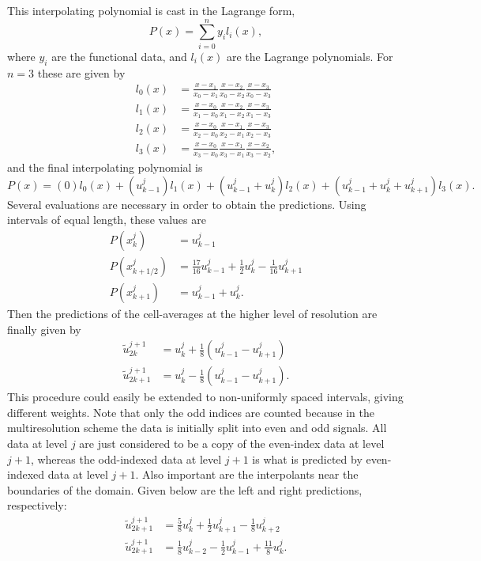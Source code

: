 \documentclass[]{article}
\begin{document}
    This interpolating polynomial is cast in the Lagrange form,
    \begin{equation}
    P(x) = \sum_{i=0}^{n} y_{i} l_{i}(x),
    \end{equation}
    where $y_{i}$ are the functional data, and $l_{i}(x)$ are the Lagrange polynomials. For $n=3$ these
    are given by
    \begin{align}
        l_{0}(x) &= \frac{x-x_1}{x_0-x_1} \frac{x-x_2}{x_0-x_2} \frac{x-x_3}{x_0-x_3} \\
        l_{1}(x) &= \frac{x-x_0}{x_1-x_0} \frac{x-x_2}{x_1-x_2} \frac{x-x_3}{x_1-x_3} \\
        l_{2}(x) &= \frac{x-x_0}{x_2-x_0} \frac{x-x_1}{x_2-x_1} \frac{x-x_3}{x_2-x_3} \\
        l_{3}(x) &= \frac{x-x_0}{x_3-x_0} \frac{x-x_1}{x_3-x_1} \frac{x-x_2}{x_3-x_2},
    \end{align}
    and the final interpolating polynomial is
    \begin{equation}
        P(x) = (0) l_{0}(x) + ( u^{j}_{k-1} ) l_{1}(x) + ( u^{j}_{k-1} + u^{j}_{k} ) l_{2}(x)
            + ( u^{j}_{k-1} + u^{j}_{k} + u^{j}_{k+1} ) l_{3}(x).
    \end{equation}
    Several evaluations are necessary in order to obtain the predictions. Using intervals of equal length, these values are
    \begin{align}
        P(x^{j}_{k}) &= u^{j}_{k-1} \\
        P(x^{j}_{k+1/2}) &= \frac{17}{16} u^{j}_{k-1} + \frac{1}{2} u^{j}_{k} - \frac{1}{16} u^{j}_{k+1} \\
        P(x^{j}_{k+1}) &= u^{j}_{k-1} + u^{j}_{k}.
    \end{align}
    Then the predictions of the cell-averages at the higher level of resolution are finally given by
    \begin{align}
        \tilde{u}^{j+1}_{2k} & = u^{j}_{k} + \frac{1}{8} \left( u^{j}_{k-1} - u^{j}_{k+1} \right) \\
        \tilde{u}^{j+1}_{2k+1} & = u^{j}_{k} - \frac{1}{8} \left( u^{j}_{k-1} - u^{j}_{k+1} \right).
    \end{align}
    This procedure could easily be extended to non-uniformly spaced intervals,
    giving different weights. Note that only the odd indices are counted because
    in the multiresolution scheme the data is initially split into even and odd
    signals. All data at level $j$ are just considered to be a copy of the
    even-index data at level $j+1$, whereas the odd-indexed data at level $j+1$
    is what is predicted by even-indexed data at level $j+1$. Also important are
    the interpolants near the boundaries of the domain. Given below are the left
    and right predictions, respectively:
    \begin{align}
        \tilde{u}^{j+1}_{2k+1} & = \frac{5}{8} u^{j}_{k}
        + \frac{1}{2} u^{j}_{k+1} - \frac{1}{8} u^{j}_{k+2} \\
        \tilde{u}^{j+1}_{2k+1} & = \frac{1}{8} u^{j}_{k-2}
        - \frac{1}{2} u^{j}_{k-1} + \frac{11}{8} u^{j}_{k}.
    \end{align}
\end{document}
